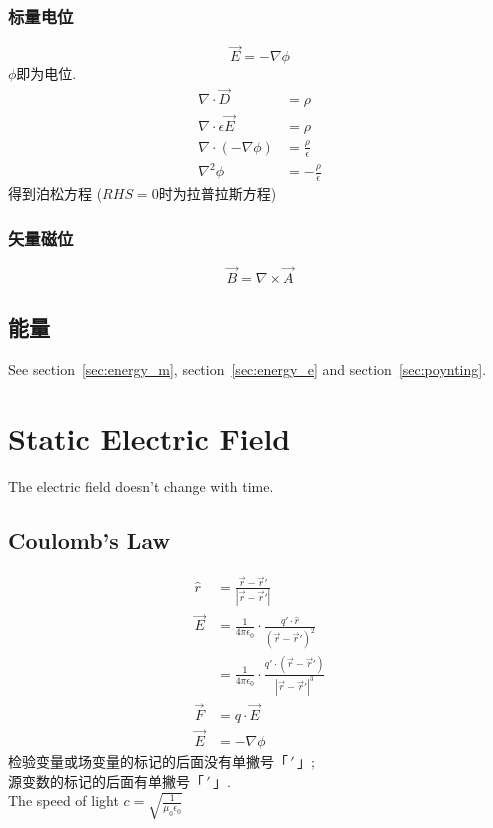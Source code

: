 \documentclass[a4paper]{report}
\begin{document}
\subsection{标量电位}
$$\vec{E}=-\nabla\phi $$
$\phi$即为电位. 
\begin{align*}
    \nabla\cdot \vec{D}&=\rho\\
    \nabla\cdot \epsilon \vec{E}&=\rho\\
    \nabla\cdot (-\nabla\phi)&=\frac{\rho}{\epsilon}\\
    \nabla^2 \phi&=-\frac{\rho}{\epsilon}
\end{align*}
得到泊松方程 ($RHS=0$时为拉普拉斯方程)
\subsection{矢量磁位}
$$\vec{B}=\nabla\times \vec{A} $$
\section{能量}
See section~\ref{sec:energy_m}, section~\ref{sec:energy_e} and section~\ref{sec:poynting}. 
\chapter{Static Electric Field}
The electric field doesn't change with time. 
\section{Coulomb's Law}
\begin{align*}
    \hat{r}&=\frac{\vec{r}-\vec{r}'}{|\vec{r}-\vec{r}'|}\\
    \vec{E}&=\frac{1}{4\pi\epsilon_0}\cdot\frac{q'\cdot \hat{r}}{(\vec{r}-\vec{r}')^2}\\
    &=\frac{1}{4\pi\epsilon_0}\cdot\frac{q'\cdot(\vec{r}-\vec{r}')}{|\vec{r}-\vec{r}'|^3}\\
    \vec{F}&=q\cdot\vec{E}\\
    \vec{E}&=-\nabla \phi
\end{align*}
检验变量或场变量的标记的后面没有单撇号「${\,\!}'\,\!$」;\\源变数的标记的后面有单撇号「${\,\!}'\,\!$」. \\
The speed of light $ c =\sqrt{\frac{1}{\mu _0\epsilon _0}} $
\end{document}
